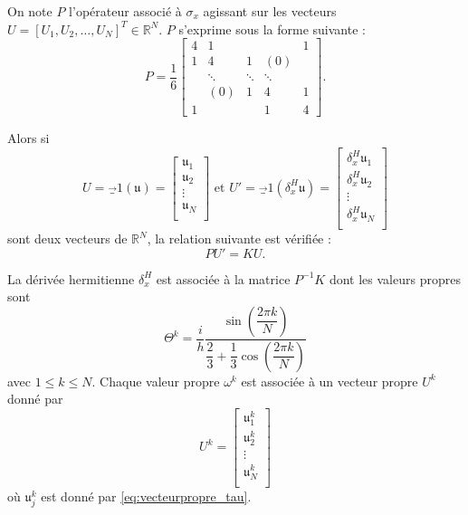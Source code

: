 On note $P$ l'opérateur associé à $\sigma_x$ agissant sur les vecteurs $U = [U_1, U_2, \ldots, U_N]^T \in \mathbb{R}^N$. $P$ s'exprime sous la forme suivante :
\begin{equation}
P = \dfrac{1}{6} 
\begin{bmatrix}
4 & 1 &   &   & 1 \\ 
1 & 4 & 1 & (0) &   \\ 
  & \ddots & \ddots & \ddots &   \\ 
  & (0) & 1 & 4 & 1 \\ 
1 &   &  & 1 & 4
\end{bmatrix}.
\end{equation}

Alors si
\begin{equation}
U = \vec_1 (\mathfrak{u}) = \begin{bmatrix}
\mathfrak{u}_1 \\
\mathfrak{u}_2 \\
\vdots \\
\mathfrak{u}_N \\
\end{bmatrix} \text{ et } 
U' = \vec_1 (\delta_x^H \mathfrak{u}) = \begin{bmatrix}
\delta_x^H \mathfrak{u}_1 \\
\delta_x^H \mathfrak{u}_2 \\
\vdots \\
\delta_x^H \mathfrak{u}_N \\
\end{bmatrix}
\end{equation}
sont deux vecteurs de $\mathbb{R}^N$, la relation suivante est vérifiée :
\begin{equation}
P U' = K U.
\end{equation}

\begin{proposition}
La dérivée hermitienne $\delta_x^H$ est associée à la matrice $P^{-1}K$ dont les valeurs propres sont
\begin{equation}
\Theta^k = \dfrac{i}{h} \dfrac{\sin \left( \dfrac{2 \pi k}{N} \right)}{\dfrac{2}{3} + \dfrac{1}{3}\cos \left( \dfrac{2 \pi k}{N} \right)}
\end{equation}
avec $1 \leq k \leq N$. Chaque valeur propre $\omega^k$ est associée à un vecteur propre $U^k$ donné par
\begin{equation}
U^k = \begin{bmatrix}
\mathfrak{u}^k_1 \\
\mathfrak{u}^k_2 \\
\vdots \\
\mathfrak{u}^k_N \\
\end{bmatrix}
\end{equation}
où $\mathfrak{u}^k_j$ est donné par \eqref{eq:vecteurpropre_tau}.
\label{prop:eigen_mat_hermitien}
\end{proposition}

